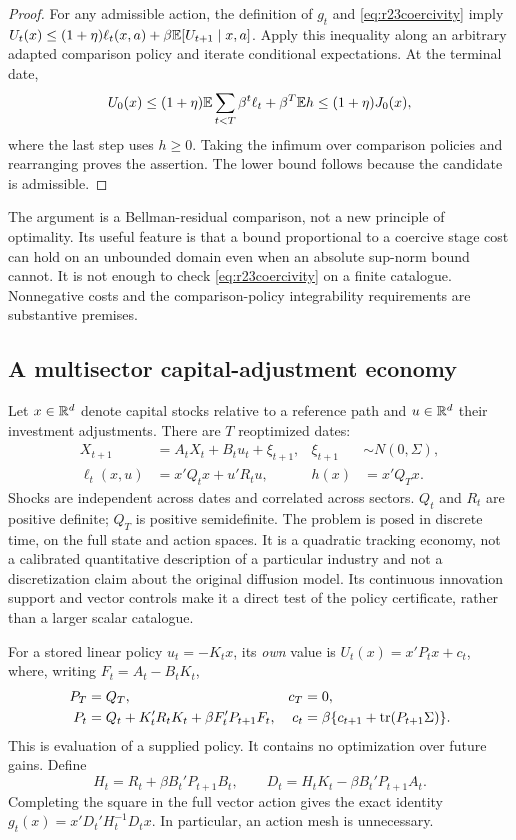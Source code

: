 \begin{proof}
For any admissible action, the definition of $g_t$ and
\eqref{eq:r23coercivity} imply
$U_t(x)\leq(1+\eta)\ell_t(x,a)+\beta\mathbb E[U_{t+1}\mid x,a]$.
Apply this inequality along an arbitrary adapted comparison policy and
iterate conditional expectations. At the terminal date,
\[
 U_0(x)\leq(1+\eta)\mathbb E\sum_{t<T}\beta^t\ell_t
                 +\beta^T\mathbb E h\leq(1+\eta)J_0(x),
\]
where the last step uses $h\geq0$. Taking the infimum over comparison
policies and rearranging proves the assertion. The lower bound follows
because the candidate is admissible.
\end{proof}

The argument is a Bellman-residual comparison, not a new principle of
optimality. Its useful feature is that a bound proportional to a coercive
stage cost can hold on an unbounded domain even when an absolute sup-norm
bound cannot. It is not enough to check \eqref{eq:r23coercivity} on a finite
catalogue. Nonnegative costs and the comparison-policy integrability
requirements are substantive premises.

\subsection{A multisector capital-adjustment economy}
Let $x\in\mathbb R^d$ denote capital stocks relative to a reference path and
$u\in\mathbb R^d$ their investment adjustments. There are $T$ reoptimized dates:
\begin{align}
 X_{t+1}&=A_tX_t+B_tu_t+\xi_{t+1},&
 \xi_{t+1}&\sim N(0,\Sigma),\label{eq:r23dynamics}\\
 \ell_t(x,u)&=x'Q_tx+u'R_tu,&h(x)&=x'Q_Tx.\label{eq:r23cost}
\end{align}
Shocks are independent across dates and correlated across sectors.
$Q_t$ and $R_t$ are positive definite; $Q_T$ is positive semidefinite.
The problem is posed in discrete time, on the full state and action spaces.
It is a quadratic tracking economy, not a calibrated quantitative description
of a particular industry and not a discretization claim about the original
diffusion model. Its continuous innovation support and vector controls make
it a direct test of the policy certificate, rather than a larger scalar
catalogue.

For a stored linear policy $u_t=-K_tx$, its \emph{own} value is
$U_t(x)=x'P_tx+c_t$, where, writing $F_t=A_t-B_tK_t$,
\begin{align}
 P_T&=Q_T,&c_T&=0,\nonumber\\
 P_t&=Q_t+K_t'R_tK_t+\beta F_t'P_{t+1}F_t,&
 c_t&=\beta\{c_{t+1}+\operatorname{tr}(P_{t+1}\Sigma)\}.
 \label{eq:r23evaluation}
\end{align}
This is evaluation of a supplied policy. It contains no optimization over
future gains. Define
\begin{equation}
 H_t=R_t+\beta B_t'P_{t+1}B_t,\qquad
 D_t=H_tK_t-\beta B_t'P_{t+1}A_t.
 \label{eq:r23residual}
\end{equation}
Completing the square in the full vector action gives the exact identity
$g_t(x)=x'D_t'H_t^{-1}D_tx$. In particular, an action mesh is unnecessary.

